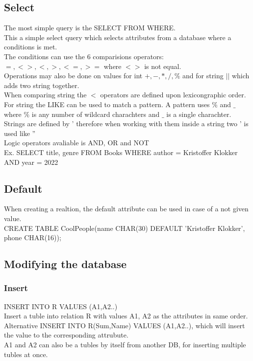 \documentclass[12pt, a4paper]{article}
\begin{document}
		\subsection{Select}
			The most simple query is the SELECT FROM WHERE.\\
			This a simple select query which selects attributes from a database where a conditions is met.\\
			The conditions can use the 6 comparisions operators: $=,<>,<,>,<=,>=$ where $<>$ is not equal.\\
			Operations may also be done on values for int $+,-,*,/,\%$ and for string $||$ which adds two string together.\\
			When comparing string the $<$ operators are defined upon lexicongraphic order.\\
			For string the LIKE can be used to match a pattern. A pattern uses $\%$ and $\_$ where $\%$ is any number of wildcard charachters and $\_$ is a single charachter.\\
			Strings are defined by ' therefore when working with them inside a string two ' is used like ''\\
			Logic operators avaliable is AND, OR and NOT\\
			Ex. SELECT title, genre FROM Books WHERE author = Kristoffer Klokker AND year = 2022\\
		\subsection{Default}
			When creating a realtion, the default attribute can be used in case of a not given value.\\
			CREATE TABLE CoolPeople(name CHAR(30) DEFAULT 'Kristoffer Klokker', phone CHAR(16));
		\subsection{Modifying the database}
			\subsubsection{Insert}
				INSERT INTO R VALUES (A1,A2..)\\
				Insert a tuble into relation R with values A1, A2 as the attributes in same order.\\
				Alternative INSERT INTO R(Sum,Name) VALUES (A1,A2..), which will insert the value to the corresponding attrubute.\\
				A1 and A2 can also be a tubles by itself from another DB, for inserting multiple tubles at once.
\end{document}

